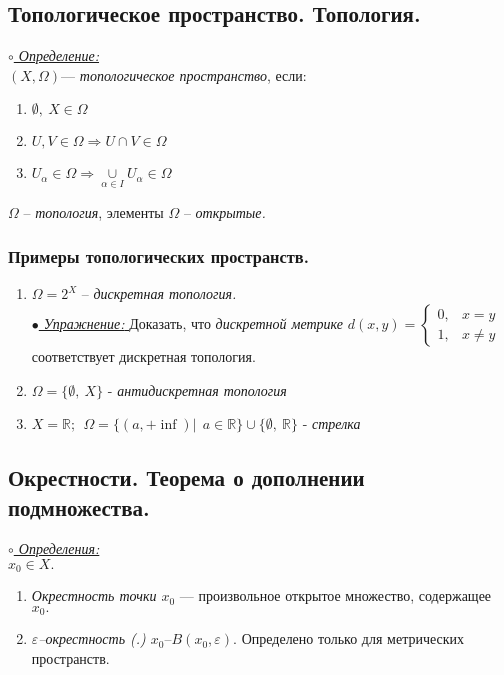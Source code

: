 \documentclass{article}
\begin{document}
\begin{spacing}{1.5}
\subsection{Топологическое пространство. Топология.}
 \underline{\textit{$\circ$ Определение:}}\\
 $(X, \Omega)$--- \emph{топологическое пространство}, если:
 \begin{enumerate}
 \item $\emptyset,~X\in \Omega$
 \item $U, V\in \Omega \Rightarrow U\cap V\in \Omega$
 \item $U_{\alpha}\in \Omega \Rightarrow \underset{\alpha\in I}{\cup}U_{\alpha}\in \Omega$
 
 \end{enumerate}
  $\Omega$ -- \emph{топология}, элементы $\Omega$ -- \emph{открытые.}
\subsubsection{Примеры топологических пространств.}
\begin{enumerate}
\item $\Omega=2^{X}$ -- \emph{дискретная топология.}\\
\underline{\emph{$\bullet$ Упражнение: }} Доказать, что \emph{дискретной метрике} $d(x, y) = \begin{cases}
  0,  &  x=y  \\
  1, &  x\neq y 
\end{cases}$ соответствует дискретная топология.
\item $\Omega=\lbrace\emptyset,~X\rbrace$ - \emph{антидискретная топология}
\item $X=\mathbb{R};~~ \Omega=\lbrace (a, +\inf)|~~a\in \mathbb{R} \rbrace\cup\lbrace\emptyset,~ \mathbb{R}\rbrace $ - \emph{стрелка}
\end{enumerate}
\subsection{Окрестности. Теорема о дополнении подмножества.}
\underline{\textit{$\circ$ Определения:}}\\
$x_{0}\in X.$
\begin{enumerate}
\item \emph{Окрестность точки $x_{0}$} --- произвольное открытое множество, содержащее $x_{0}.$
\item \emph{$\varepsilon$--окрестность (.) $x_{0}$}--$B(x_{0},\varepsilon).$ Определено только для метрических пространств.
\end{enumerate}

\end{spacing}
\end{document}
